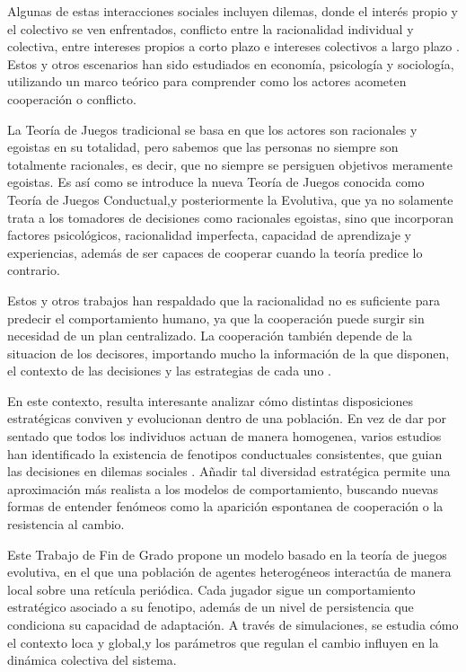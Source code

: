 \documentclass[a4paper,12pt]{report}
\begin{document}
Algunas de estas interacciones sociales incluyen dilemas, donde el interés propio y el colectivo se ven enfrentados, conflicto entre la racionalidad individual y colectiva, entre intereses propios a corto plazo e intereses colectivos a largo plazo \cite{dawes1980social,kollock1998social,vanLange2013psychology}. Estos y otros escenarios han sido estudiados en economía, psicología y sociología, utilizando un marco teórico para comprender como los actores acometen cooperación o conflicto.

La Teoría de Juegos tradicional se basa en que los actores son racionales y egoistas en su totalidad, pero sabemos que las personas no siempre son totalmente racionales, es decir, que no siempre se persiguen objetivos meramente egoistas.
Es así como se introduce la nueva Teoría de Juegos conocida como Teoría de Juegos Conductual\cite{camerer2003behavioral,kagel1995handbook},y posteriormente la Evolutiva\cite{sigmund2010calculus,gintis2009game}, que ya no solamente trata a los tomadores de decisiones como racionales egoistas, sino que incorporan factores psicológicos, racionalidad imperfecta, capacidad de aprendizaje y experiencias, además de ser capaces de cooperar cuando la teoría predice lo contrario.

Estos y otros trabajos han respaldado que la racionalidad no es suficiente para predecir el comportamiento humano, ya que la cooperación puede surgir sin necesidad de un plan centralizado. La cooperación también depende de la situacion de los decisores, importando mucho la información de la que disponen, el contexto de las decisiones y las estrategias de cada uno \cite{sigmund2010calculus,gintis2009game,myerson1991game}.

En este contexto, resulta interesante analizar cómo distintas disposiciones estratégicas conviven y evolucionan dentro de una población. En vez de dar por sentado que todos los individuos actuan de manera homogenea, varios estudios han identificado la existencia de fenotipos conductuales consistentes, que guian las decisiones en dilemas sociales \cite{paper_principal}. Añadir tal diversidad estratégica permite una aproximación más realista a los modelos de comportamiento, buscando nuevas formas de entender fenómeos como la aparición espontanea de cooperación o la resistencia al cambio.

\newpage

Este Trabajo de Fin de Grado propone un modelo basado en la teoría de juegos evolutiva, en el que una población de agentes heterogéneos  interactúa de manera local sobre una retícula periódica. Cada jugador sigue un comportamiento estratégico asociado a su fenotipo, además de un nivel de persistencia que condiciona su capacidad de adaptación. A través de simulaciones, se estudia cómo el contexto loca y global,y los parámetros que regulan el cambio influyen en la dinámica colectiva del sistema.
\end{document}
